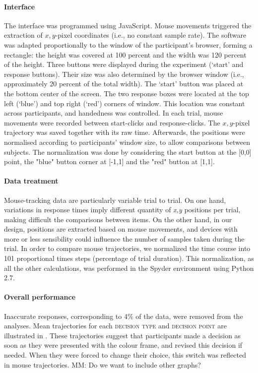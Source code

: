 \documentclass{article}
\newcommand{\addMM}[1]{{\leavevmode\color{red}#1}}
\begin{document}
\paragraph{Interface}
The interface was programmed using JavaScript. Mouse movements triggered the extraction of $x,y$-pixel coordinates (i.e., no constant sample rate). The software was adapted proportionally to the window of the participant's browser, forming a rectangle: the height was covered at 100 percent and the width was 120 percent of the height. 
Three buttons were displayed during the experiment (`start' and response buttons). Their size was also determined by the browser window (i.e., approximately 20 percent of the total width). The `start' button was placed at the bottom center of the screen. The two response boxes were located at the top left (`blue') and top right (`red') corners of window. This location was constant across participants, and handedness was controlled.  
In each trial, mouse movements were recorded between start-clicks and response-clicks. The $x,y$-pixel trajectory was saved together with its raw time. Afterwards, the positions were normalised according to participants' window size, to allow comparisons between subjects. The normalization was done by considering the start button at the [0,0] point, the "blue" button corner at [-1,1] and the "red" button at [1,1]. 

\paragraph{Data treatment}
Mouse-tracking data are particularly variable trial to trial. On one hand, variations in response times imply different quantity of \textit{x,y} positions per trial, making difficult the comparisons between items. On the other hand, in our design, positions are extracted based on mouse movements, and devices with more or less sensibility could influence the number of samples taken during the trial. In order to compare mouse trajectories, we normalized the time course into 101 proportional times steps (percentage of trial duration). This normalization, as all the other calculations, was performed in the Spyder environment using Python 2.7. 

\paragraph{Overall performance}
Inaccurate responses, corresponding to 4\% of the data, were removed from the analyses. 
Mean trajectories for each \textsc{decision type} and \textsc{decision point} are illustrated in . 
These trajectories suggest that participants made a decision as soon as they were presented with the colour frame, and revised this decision if needed. When they were forced to change their choice, this switch was reflected in mouse trajectories. 
\addMM{MM: Do we want to include other graphs?}
\end{document}
